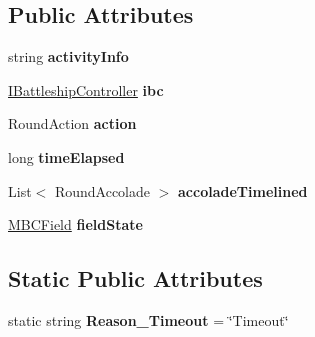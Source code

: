 \subsection*{Public Attributes}
\begin{DoxyCompactItemize}
\item 
\hypertarget{class_m_b_c_1_1_core_1_1_m_b_c_round_log_1_1_round_activity_a1919487690e8c749633f20f7724c1886}{string {\bfseries activity\-Info}}\label{class_m_b_c_1_1_core_1_1_m_b_c_round_log_1_1_round_activity_a1919487690e8c749633f20f7724c1886}

\item 
\hypertarget{class_m_b_c_1_1_core_1_1_m_b_c_round_log_1_1_round_activity_a7c8e48888aba91f38b0e89b07e0317f5}{\hyperlink{interface_m_b_c_1_1_core_1_1_i_battleship_controller}{I\-Battleship\-Controller} {\bfseries ibc}}\label{class_m_b_c_1_1_core_1_1_m_b_c_round_log_1_1_round_activity_a7c8e48888aba91f38b0e89b07e0317f5}

\item 
\hypertarget{class_m_b_c_1_1_core_1_1_m_b_c_round_log_1_1_round_activity_a9d6c6d8874a8f5ab3f1b48325d636699}{Round\-Action {\bfseries action}}\label{class_m_b_c_1_1_core_1_1_m_b_c_round_log_1_1_round_activity_a9d6c6d8874a8f5ab3f1b48325d636699}

\item 
\hypertarget{class_m_b_c_1_1_core_1_1_m_b_c_round_log_1_1_round_activity_a6203a06f84c978692b6ba1610f040acb}{long {\bfseries time\-Elapsed}}\label{class_m_b_c_1_1_core_1_1_m_b_c_round_log_1_1_round_activity_a6203a06f84c978692b6ba1610f040acb}

\item 
\hypertarget{class_m_b_c_1_1_core_1_1_m_b_c_round_log_1_1_round_activity_ad398165a8aab2db62f42cb68f29ca279}{List$<$ Round\-Accolade $>$ {\bfseries accolade\-Timelined}}\label{class_m_b_c_1_1_core_1_1_m_b_c_round_log_1_1_round_activity_ad398165a8aab2db62f42cb68f29ca279}

\item 
\hypertarget{class_m_b_c_1_1_core_1_1_m_b_c_round_log_1_1_round_activity_aa6b34c20a3c0428feb68b23456385490}{\hyperlink{class_m_b_c_1_1_core_1_1_m_b_c_field}{M\-B\-C\-Field} {\bfseries field\-State}}\label{class_m_b_c_1_1_core_1_1_m_b_c_round_log_1_1_round_activity_aa6b34c20a3c0428feb68b23456385490}

\end{DoxyCompactItemize}
\subsection*{Static Public Attributes}
\begin{DoxyCompactItemize}
\item 
\hypertarget{class_m_b_c_1_1_core_1_1_m_b_c_round_log_1_1_round_activity_ac7c8f83aff0553f4aa077115818e2b97}{static string {\bfseries Reason\-\_\-\-Timeout} = \char`\"{}Timeout\char`\"{}}\label{class_m_b_c_1_1_core_1_1_m_b_c_round_log_1_1_round_activity_ac7c8f83aff0553f4aa077115818e2b97}

\end{DoxyCompactItemize}


